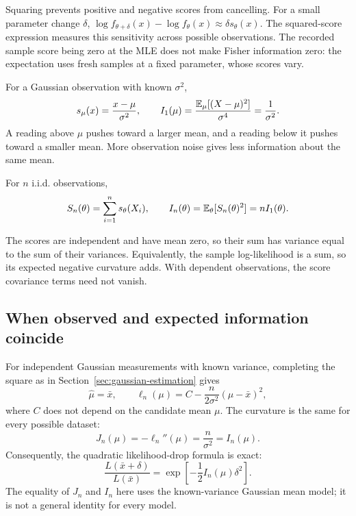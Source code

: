 Squaring prevents positive and negative scores from cancelling.
For a small parameter change \(\delta\),
\(\log f_{\theta+\delta}(x)-\log f_\theta(x)
\approx\delta s_\theta(x)\). The squared-score expression measures
this sensitivity across possible observations.
The recorded sample score being zero at the MLE does not make Fisher
information zero: the expectation uses fresh samples at a fixed
parameter, whose scores vary.

For a Gaussian observation with known \(\sigma^2\),
\[
  s_\mu(x)=\frac{x-\mu}{\sigma^2},\qquad
  I_1(\mu)=\frac{\mathbb{E}_\mu[(X-\mu)^2]}{\sigma^4}
          =\frac1{\sigma^2}.
\]
A reading above \(\mu\) pushes toward a larger mean, and a reading below
it pushes toward a smaller mean. More observation noise gives less
information about the same mean.

\begin{result}
For \(n\) i.i.d. observations,
\begin{equation}
  S_n(\theta)=\sum_{i=1}^n s_\theta(X_i),\qquad
  I_n(\theta)=\mathbb{E}_\theta[S_n(\theta)^2]=nI_1(\theta).
  \label{eq:fisher-additivity}
\end{equation}
\end{result}

The scores are independent and have mean zero, so their sum has variance
equal to the sum of their variances. Equivalently, the sample
log-likelihood is a sum, so its expected negative curvature adds.
With dependent observations, the score covariance terms need not vanish.

\subsection{When observed and expected information coincide}

For independent Gaussian measurements with known variance, completing
the square as in Section~\ref{sec:gaussian-estimation} gives
\[
  \widehat\mu=\bar x,\qquad
  \ell_n(\mu)=C-\frac{n}{2\sigma^2}(\mu-\bar x)^2,
\]
where \(C\) does not depend on the candidate mean \(\mu\).
The curvature is the same for every possible dataset:
\begin{equation}
  J_n(\mu)=-\ell_n''(\mu)=\frac{n}{\sigma^2}
         =I_n(\mu).
  \label{eq:gaussian-observed-expected}
\end{equation}
Consequently, the quadratic likelihood-drop formula is exact:
\[
  \frac{L(\bar x+\delta)}{L(\bar x)}
     =\exp\!\left[-\frac12 I_n(\mu)\delta^2\right].
\]
The equality of \(J_n\) and \(I_n\) here uses the known-variance
Gaussian mean model; it is not a general identity for every model.

